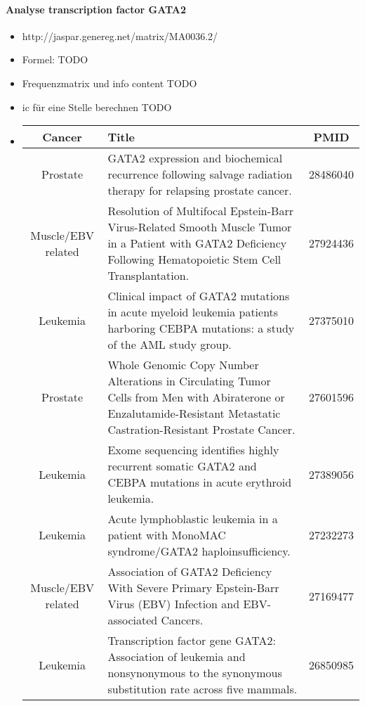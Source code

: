 \documentclass[a4paper,10pt]{article}
\begin{document}
	\parindent0pt
	\paragraph{Analyse transcription factor GATA2}
	\begin{itemize}
		\item http://jaspar.genereg.net/matrix/MA0036.2/
		\item Formel: TODO
		\item Frequenzmatrix und info content TODO
		\item ic für eine Stelle berechnen TODO
		\item \begin{tabular}[t]{|c|p{10.5cm}|c|}
			\hline 
			Cancer & Title & PMID \\ 
			\hline 
			Prostate & GATA2 expression and biochemical recurrence following salvage radiation therapy for relapsing prostate cancer. & 28486040 \\ 
			\hline 
			Muscle/EBV related & Resolution of Multifocal Epstein-Barr Virus-Related Smooth Muscle Tumor in a Patient with GATA2 Deficiency Following Hematopoietic Stem Cell Transplantation. & 27924436 \\ 
			\hline 
			Leukemia & Clinical impact of GATA2 mutations in acute myeloid leukemia patients harboring CEBPA mutations: a study of the AML study group. & 27375010 \\ 
			\hline 
			Prostate & Whole Genomic Copy Number Alterations in Circulating Tumor Cells from Men with Abiraterone or Enzalutamide-Resistant Metastatic Castration-Resistant Prostate Cancer. & 27601596 \\ 
			\hline 
			Leukemia & Exome sequencing identifies highly recurrent somatic GATA2 and CEBPA mutations in acute erythroid leukemia. & 27389056 \\ 
			\hline 
			Leukemia & Acute lymphoblastic leukemia in a patient with MonoMAC syndrome/GATA2 haploinsufficiency. & 27232273 \\ 
			\hline 
			Muscle/EBV related & Association of GATA2 Deficiency With Severe Primary Epstein-Barr Virus (EBV) Infection and EBV-associated Cancers. & 27169477 \\ 
			\hline 
			Leukemia & Transcription factor gene GATA2: Association of leukemia and nonsynonymous to the synonymous substitution rate across five mammals. & 26850985 \\ 
			\hline 
		\end{tabular} 
	\end{itemize}
	
\end{document}
